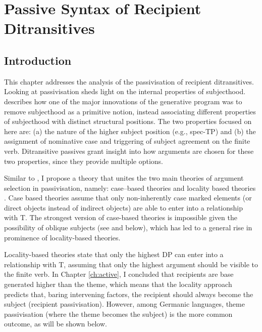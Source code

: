 \chapter{Passive Syntax of Recipient Ditransitives}
\section{Introduction}
This chapter addresses the analysis of the passivisation of recipient ditransitives. Looking at passivisation sheds light on the internal properties of subjecthood. \cite{McCloskey.1997} describes how one of the major innovations of the generative program was to remove subjecthood as a primitive notion, instead associating different properties of subjecthood with distinct structural positions. The two properties focused on here are: (a) the nature of the higher subject position (e.g., spec-TP) and (b) the assignment of nominative case and triggering of subject agreement on the finite verb. Ditransitive passives grant insight into how arguments are chosen for these two properties, since they provide multiple options.

Similar to \cite{Platzack.2005}, I propose a theory that unites the two main theories of argument selection in passivisation, namely: case--based theories \citep{Larson.1988,Baker.1988,Pesetsky.1996,Holmberg.2001} and locality based theories \citep{Falk.1990,Holmberg.1995,McGinnis.1998,Anagnostopoulou.2003}.  Case based theories assume that only non-inherently case marked elements (or direct objects instead of indirect objects) are able to enter into a relationship with T. The strongest version of case-based theories is impossible given the possibility of oblique subjects (see \citealt{Zaenen.1985} and below), which has led to a general rise in prominence of locality-based theories.

Locality-based theories state that only the highest DP can enter into a relationship with T, assuming that only the highest argument should be visible to the finite verb. In Chapter \ref{ch:active}, I concluded that recipients are base generated higher than the theme, which means that the locality approach predicts that, baring intervening factors, the recipient should always become the subject (recipient passivisation). However, among Germanic languages, theme passivisation (where the theme becomes the subject) is the more common outcome, as will be shown below.

